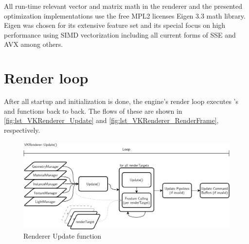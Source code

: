 All run-time relevant vector and matrix math in the renderer and the presented optimization implementations use the free MPL2 licenses Eigen 3.3 math library. Eigen was chosen for its extensive feature set and its special focus on high performance using SIMD vectorization including all current forms of SSE and AVX among others\cite{Guennebaud.2010}.

\section{Render loop} 
After all startup and initialization is done, the engine's render loop executes 's  and  functions back to back. The flows of these are shown in \autoref{fig:lst_VKRenderer_Update} and \autoref{fig:lst_VKRenderer_RenderFrame}, respectively. 

\begin{figure}[htb]
  \centering
  \includegraphics[width=1.0\textwidth]{pictures/Tachyon_VKRenderer_Update}
  \caption[VKRenderer's Update()]{Renderer Update function}\label{fig:lst_VKRenderer_Update}
\end{figure} 

